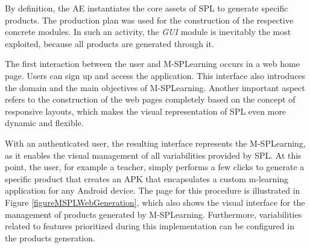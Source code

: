 By definition, the AE instantiates the core assets of SPL to generate specific products. The production plan was used for the construction of the respective concrete modules. In such an activity, the \textit{GUI} module is inevitably the most exploited, because all products are generated through it.

The first interaction between the user and M-SPLear\allowbreak ning occurs in a web home page. Users can sign up and access the application. This interface also introduces the domain and the main objectives of M-SPLear\allowbreak ning. Another important aspect refers to the construction of the web pages completely based on the concept of responsive layouts, which makes the visual representation of SPL even more dynamic and flexible. 

%

With an authenticated user, the resulting interface represents the M-SPLear\allowbreak ning, as it enables the visual management of all variabilities provided by SPL. At this point, the user, for example a teacher, simply performs a few clicks to generate a specific product that creates an APK that encapsulates a custom m-learning application for any Android device. The page for this procedure is illustrated in Figure \ref{figureMSPLWebGeneration}, which also shows the visual interface for the management of products generated by M-SPLear\allowbreak ning. Furthermore, variabilities related to features prioritized during this implementation can be configured in the products generation.

